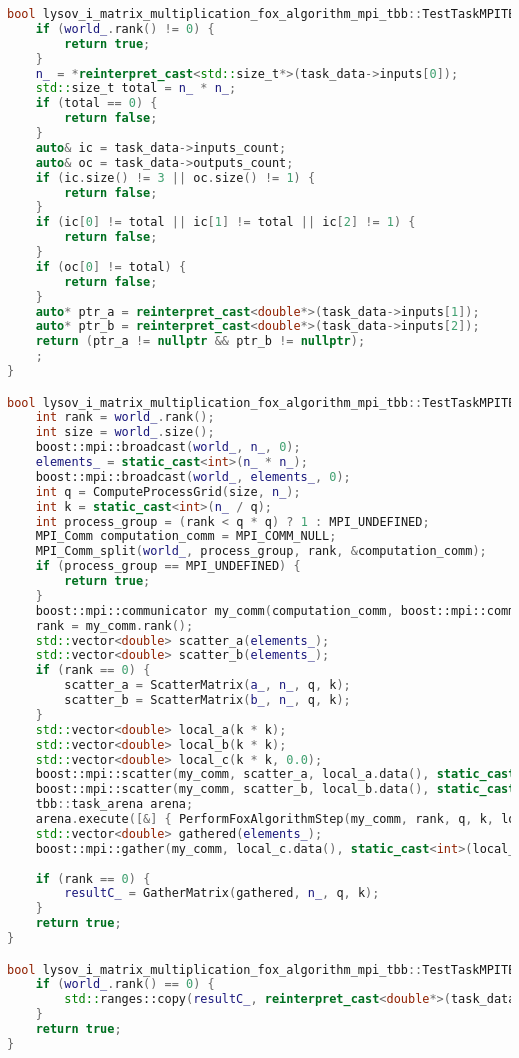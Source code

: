 \documentclass[12pt,a4paper]{extarticle}
\begin{document}
\begin{lstlisting}[language=C++]
bool lysov_i_matrix_multiplication_fox_algorithm_mpi_tbb::TestTaskMPITBB::ValidationImpl() {
	if (world_.rank() != 0) {
		return true;
	}
	n_ = *reinterpret_cast<std::size_t*>(task_data->inputs[0]);
	std::size_t total = n_ * n_;
	if (total == 0) {
		return false;
	}
	auto& ic = task_data->inputs_count;
	auto& oc = task_data->outputs_count;
	if (ic.size() != 3 || oc.size() != 1) {
		return false;
	}
	if (ic[0] != total || ic[1] != total || ic[2] != 1) {
		return false;
	}
	if (oc[0] != total) {
		return false;
	}
	auto* ptr_a = reinterpret_cast<double*>(task_data->inputs[1]);
	auto* ptr_b = reinterpret_cast<double*>(task_data->inputs[2]);
	return (ptr_a != nullptr && ptr_b != nullptr);
	;
}

bool lysov_i_matrix_multiplication_fox_algorithm_mpi_tbb::TestTaskMPITBB::RunImpl() {
	int rank = world_.rank();
	int size = world_.size();
	boost::mpi::broadcast(world_, n_, 0);
	elements_ = static_cast<int>(n_ * n_);
	boost::mpi::broadcast(world_, elements_, 0);
	int q = ComputeProcessGrid(size, n_);
	int k = static_cast<int>(n_ / q);
	int process_group = (rank < q * q) ? 1 : MPI_UNDEFINED;
	MPI_Comm computation_comm = MPI_COMM_NULL;
	MPI_Comm_split(world_, process_group, rank, &computation_comm);
	if (process_group == MPI_UNDEFINED) {
		return true;
	}
	boost::mpi::communicator my_comm(computation_comm, boost::mpi::comm_take_ownership);
	rank = my_comm.rank();
	std::vector<double> scatter_a(elements_);
	std::vector<double> scatter_b(elements_);
	if (rank == 0) {
		scatter_a = ScatterMatrix(a_, n_, q, k);
		scatter_b = ScatterMatrix(b_, n_, q, k);
	}
	std::vector<double> local_a(k * k);
	std::vector<double> local_b(k * k);
	std::vector<double> local_c(k * k, 0.0);
	boost::mpi::scatter(my_comm, scatter_a, local_a.data(), static_cast<int>(local_a.size()), 0);
	boost::mpi::scatter(my_comm, scatter_b, local_b.data(), static_cast<int>(local_b.size()), 0);
	tbb::task_arena arena;
	arena.execute([&] { PerformFoxAlgorithmStep(my_comm, rank, q, k, local_a, local_b, local_c); });
	std::vector<double> gathered(elements_);
	boost::mpi::gather(my_comm, local_c.data(), static_cast<int>(local_c.size()), gathered, 0);
	
	if (rank == 0) {
		resultC_ = GatherMatrix(gathered, n_, q, k);
	}
	return true;
}

bool lysov_i_matrix_multiplication_fox_algorithm_mpi_tbb::TestTaskMPITBB::PostProcessingImpl() {
	if (world_.rank() == 0) {
		std::ranges::copy(resultC_, reinterpret_cast<double*>(task_data->outputs[0]));
	}
	return true;
}

\end{lstlisting}
\end{document}

